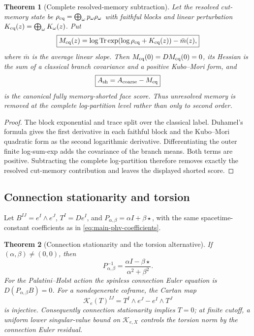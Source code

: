 \documentclass[11pt]{article}
\newtheorem{theorem}{Theorem}[section]
\theoremstyle{definition}
\theoremstyle{remark}
\newcommand{\Tr}{\operatorname{Tr}}
\begin{document}
\begin{theorem}[Complete resolved-memory subtraction]
\label{thm:supp-memory-short}
Let the resolved cut-memory state be
$\rho_{\rm cq}=\bigoplus_\omega p_\omega\rho_\omega$ with faithful blocks and
linear perturbation
$K_{\rm cq}(z)=\bigoplus_\omega K_\omega(z)$.  Put
\begin{equation}
 \boxed{
 M_{\rm cq}(z)
 =\log\Tr\exp(\log\rho_{\rm cq}+K_{\rm cq}(z))-\bar m(z),}
 \label{eq:supp-memory-logpartition}
\end{equation}
where $\bar m$ is the average linear slope.  Then
$M_{\rm cq}(0)=DM_{\rm cq}(0)=0$, its Hessian is the sum of a classical branch
covariance and a positive Kubo--Mori form, and
\begin{equation}
 \boxed{A_{\rm sh}=A_{\rm coarse}-M_{\rm cq}}
 \label{eq:supp-memory-short}
\end{equation}
is the canonical fully memory-shorted face score.  Thus unresolved memory is
removed at the complete log-partition level rather than only to second order.
\end{theorem}

\begin{proof}
The block exponential and trace split over the classical label.  Duhamel's
formula gives the first derivative in each faithful block and the Kubo--Mori
quadratic form as the second logarithmic derivative.  Differentiating the outer
finite log-sum-exp adds the covariance of the branch means.  Both terms are
positive.  Subtracting the complete log-partition therefore removes exactly the
resolved cut-memory contribution and leaves the displayed shorted score.
\end{proof}

\subsection{Connection stationarity and torsion}

Let $B^{IJ}=e^I\wedge e^J$, $T^I=De^I$, and
$P_{\alpha,\beta}=\alpha I+\beta\star$, with the same
spacetime-constant coefficients as in \eqref{eq:main-phv-coefficients}.

\begin{theorem}[Connection stationarity and the torsion alternative]
\label{thm:supp-palatini-torsion}
If $(\alpha,\beta)\ne(0,0)$, then
\begin{equation}
 \boxed{
 P_{\alpha,\beta}^{-1}
 =\frac{\alpha I-\beta\star}{\alpha^2+\beta^2}.}
 \label{eq:supp-palatini-inverse}
\end{equation}
For the Palatini--Holst action the spinless connection Euler equation is
$D(P_{\alpha,\beta}B)=0$.  For a nondegenerate coframe, the Cartan map
\[
 \mathcal K_e(T)^{IJ}=T^I\wedge e^J-e^I\wedge T^J
\]
is injective.  Consequently connection stationarity implies $T=0$; at finite
cutoff, a uniform lower singular-value bound on $\mathcal K_{e,X}$ controls the
torsion norm by the connection Euler residual.
\end{theorem}
\end{document}
